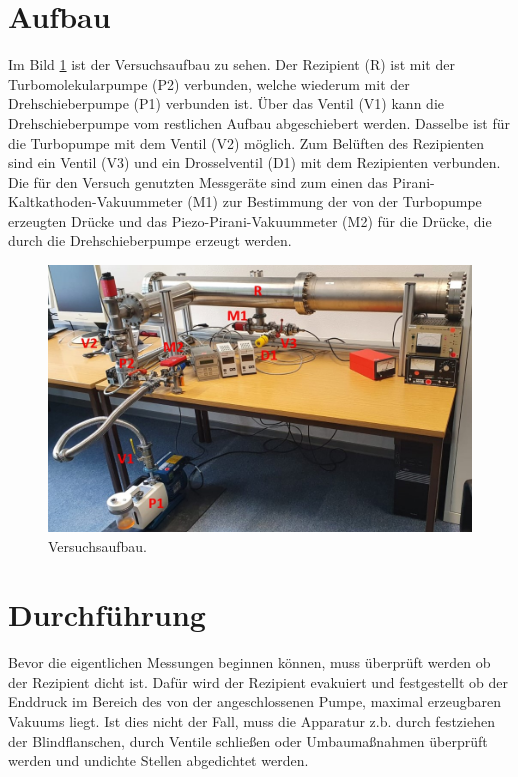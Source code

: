 \section{Aufbau}
\label{sec:Aufbau}
Im Bild \ref{fig:Versuchsaufbau} ist der Versuchsaufbau zu sehen. Der Rezipient (R) ist mit der Turbomolekularpumpe (P2) verbunden, 
welche wiederum mit der Drehschieberpumpe (P1) verbunden ist. Über das Ventil (V1) kann die Drehschieberpumpe vom 
restlichen Aufbau abgeschiebert werden. Dasselbe ist für die Turbopumpe mit dem Ventil (V2) möglich.
Zum Belüften des Rezipienten sind ein Ventil (V3) und ein Drosselventil (D1) mit dem Rezipienten verbunden.
Die für den Versuch genutzten Messgeräte sind zum einen das Pirani-Kaltkathoden-Vakuummeter (M1) zur Bestimmung der 
von der Turbopumpe erzeugten Drücke und das Piezo-Pirani-Vakuummeter (M2) für die Drücke, die durch die Drehschieberpumpe 
erzeugt werden.

    \begin{figure}
        \centering
        \includegraphics[width=1\textwidth]{Versuchsaufbau_V70.jpeg}
        \caption{Versuchsaufbau.}
        \label{fig:Versuchsaufbau}
    \end{figure}


\section{Durchführung}
\label{sec:Durchführung}
Bevor die eigentlichen Messungen beginnen können, muss überprüft werden ob der Rezipient dicht ist.
Dafür wird der Rezipient evakuiert und festgestellt ob der Enddruck im Bereich des von der angeschlossenen Pumpe, maximal erzeugbaren Vakuums liegt. 
Ist dies nicht der Fall, muss die Apparatur z.b. durch festziehen der Blindflanschen, durch Ventile schließen oder Umbaumaßnahmen überprüft werden und undichte Stellen abgedichtet werden.

